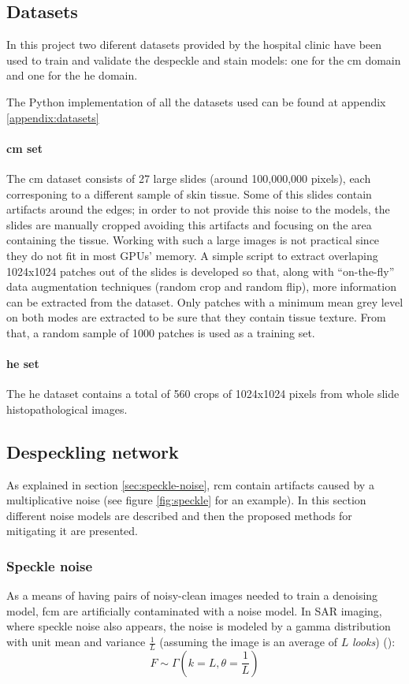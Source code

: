 \documentclass[../main.tex]{subfiles}
\begin{document}
\subsection{Datasets}
In this project two diferent datasets provided by the hospital clinic
have been used to train and validate the despeckle and stain models:
one for the \gls{cm} domain and one for the \gls{he} domain.

The Python implementation of all the datasets used can be found at appendix
\ref{appendix:datasets}

\paragraph{\gls{cm} set}
The \gls{cm} dataset consists of 27 large slides (around 100,000,000 pixels),
each corresponing to a different sample of skin tissue.
Some of this slides contain artifacts around the edges; in order to not
provide this noise to the models, the slides are manually cropped avoiding
this artifacts and focusing on the area containing the tissue.
Working with such a large images is not practical since they do not fit
in most GPUs' memory. A simple script to extract overlaping 1024x1024
patches out of the slides is developed so that, along with ``on-the-fly''
data augmentation techniques (random crop and random flip), more information
can be extracted from the dataset.
Only patches with a minimum mean grey level on both modes are extracted to
be sure that they contain tissue texture.
From that, a random sample of 1000 patches is used as a training set.

\paragraph{\gls{he} set}
The \gls{he} dataset contains a total of 560 crops of 1024x1024 pixels from
whole slide histopathological images.

\subsection{Despeckling network}
\label{sec:despeckling-network}
As explained in section \ref{sec:speckle-noise}, \gls{rcm} contain artifacts
caused by a multiplicative noise (see figure \ref{fig:speckle} for an example).
In this section different noise models are
described and then the proposed methods for mitigating it are presented.

\subsubsection{Speckle noise}
As a means of having pairs of noisy-clean images needed to train a denoising
model, \gls{fcm} are artificially contaminated with a noise model.
In SAR imaging, where speckle noise also appears, the noise is modeled by
a gamma distribution with unit mean and variance $\frac{1}{L}$ (assuming
the image is an average of $L$ \emph{looks})
(\cite{GammaSpeckle}):
\begin{equation}\label{eq:gamma-distribution}
F \sim \Gamma(k = L, \theta = \frac{1}{L})
\end{equation}
\end{document}
